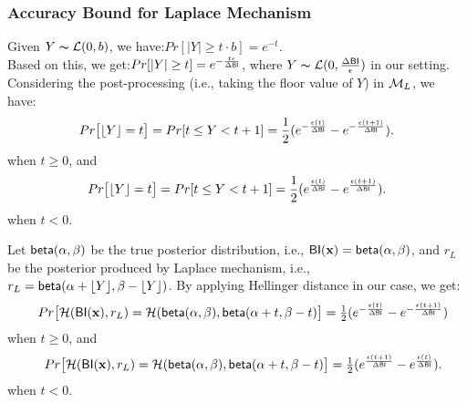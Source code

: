 \documentclass{article}
\begin{document}
\subsubsection{Accuracy Bound for Laplace Mechanism}
\label{subsec_accuracy_lap}
Given $Y \thicksim \mathcal{L}(0, b)$, we have\cite{dwork2014algorithmic}:$Pr[|Y| \geq t \cdot b] = e^{- t}.$\\
Based on this, we get:$Pr[|Y| \geq t] = e^{- \frac{t \epsilon}{\Delta \mathsf{BI}}}$, where $Y \thicksim \mathcal{L}(0, \frac{\Delta \mathsf{BI}}{\epsilon})$ in our setting.\\

Considering the post-processing (i.e., taking the floor value of $Y$) in $\mathcal{M}_L$, we have:
\[
Pr\big[\lfloor Y \rfloor = t\big] 
= Pr[ t \leq Y < t + 1] 
= \frac{1}{2} (e^{- \frac{\epsilon (t)}{\Delta \mathsf{BI}}} - e^{- \frac{\epsilon (t + 1)}{\Delta \mathsf{BI}}}).
\]
when $t \geq 0$, and\\
\[
Pr\big[\lfloor Y \rfloor = t\big] 
= Pr[ t \leq Y < t + 1] 
= \frac{1}{2} (e^{\frac{\epsilon (t)}{\Delta \mathsf{BI}}} - e^{\frac{\epsilon (t + 1)}{\Delta \mathsf{BI}}}).
\]
when $t < 0$.

Let $\mathsf{beta}(\alpha, \beta)$ be the true posterior distribution, i.e., $\mathsf{BI}(\textbf{x}) = \mathsf{beta}(\alpha, \beta)$, and $r_L$ be the posterior produced by Laplace mechanism, i.e., $r_L = \mathsf{beta}(\alpha + \lfloor Y \rfloor, \beta - \lfloor Y \rfloor)$. By applying Hellinger distance in our case, we get:
$$
\begin{array}{rcl}
& Pr\big[\mathcal{H}(\mathsf{BI}(\textbf{x}), r_L ) 
= \mathcal{H}(\mathsf{beta}(\alpha, \beta), \mathsf{beta}(\alpha + t, \beta - t)\big] 
=  \frac{1}{2} (e^{- \frac{\epsilon (t)}{\Delta \mathsf{BI}}} - e^{- \frac{\epsilon (t + 1)}{\Delta \mathsf{BI}}})\\
\end{array}
$$
when $t \geq 0$, and\\
$$
\begin{array}{rcl}
& Pr\big[\mathcal{H}(\mathsf{BI}(\textbf{x}), r_L ) 
= \mathcal{H}(\mathsf{beta}(\alpha, \beta), \mathsf{beta}(\alpha + t, \beta - t)\big] 
= \frac{1}{2} (e^{\frac{\epsilon (t + 1)}{\Delta \mathsf{BI}}} - e^{\frac{\epsilon (t)}{\Delta \mathsf{BI}}}).
\end{array}
$$
when $t < 0$.\\
\end{document}
